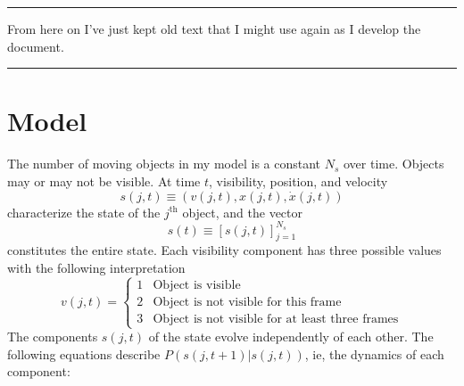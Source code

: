 \documentclass[12pt]{article}
\renewcommand{\th}{^{\text{th}}}
\newcommand{\os}[4]{{\left[ #1(#2) \right]}_{#3}^{#4}} %
\newcommand{\ti}[2]{{#1}{(#2)}}                         %
\begin{document}
\newpage
\hrule
From here on I've just kept old text that I might use again as I
develop the document.\\
\hrule
\section{Model}
\label{sec:model}

The number of moving objects in my model is a constant $N_s$ over
time.  Objects may or may not be visible.  At time $t$, visibility,
position, and velocity
\begin{equation*}
  \ti{s}{j,t} \equiv \left(\ti{v}{j,t},\ti{x}{j,t},\ti{\dot x}{j,t} \right)
\end{equation*}
characterize the state of the $j\th$ object, and the vector
\begin{equation*}
  \ti{s}{t} \equiv \os{s}{j,t}{j=1}{N_s}
\end{equation*}
constitutes the entire state.  Each visibility component has three
possible values with the following interpretation
\begin{equation*}
  \ti{v}{j,t} =
  \begin{cases}
    1 & \text{Object is visible} \\
    2 & \text{Object is not visible for this frame} \\
    3 & \text{Object is not visible for at least three frames}
  \end{cases}
\end{equation*}
The components $\ti{s}{j,t}$ of the state evolve independently of each
other.  The following equations describe
$P(\ti{s}{j,t+1}|\ti{s}{j,t})$, ie, the dynamics of each component:
\end{document}
